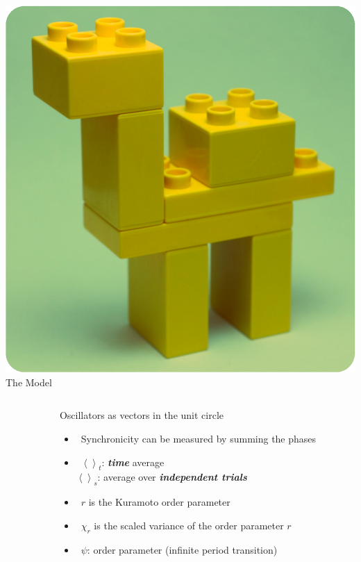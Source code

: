 \documentclass[serif,mathserif]{beamer}
\begin{document}
\begin{frame}{\includegraphics[height=0.06\textheight]{lego-model.eps}\hspace{0.25cm} The Model}
    \begin{columns}
        \begin{column}{0.4\textwidth}
        \end{column}
        \begin{column}{0.6\textwidth}
            Oscillators as vectors in the unit circle
            \begin{itemize}
                \vspace{0.25cm}
                \item \ \pause Synchronicity can be measured by summing the phases
                \vspace{0.25cm}
                \item \ \pause $\left< \right>_t$: \textit{\textbf{time}} average\\
                    \hspace{0.1cm}$\left< \right>_s$: average over \textit{\textbf{independent trials}}
                \vspace{0.25cm}
                \item \ \pause $r$ is the Kuramoto order parameter
                \vspace{0.25cm}
                \item \ \pause $\chi_r$ is the scaled variance of the order parameter $r$
                \vspace{0.25cm}
                \item \ \pause $\psi$: order parameter (infinite period transition)
            \end{itemize}
        \end{column}
    \end{columns}
\end{frame}
\end{document}
